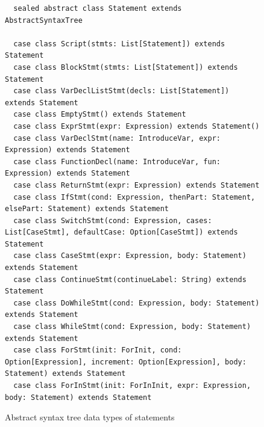 \documentclass[12pt]{report}
\begin{document}
\begin{figure}
{}
\begin{lstlisting}
  sealed abstract class Statement extends AbstractSyntaxTree

  case class Script(stmts: List[Statement]) extends  Statement
  case class BlockStmt(stmts: List[Statement]) extends Statement
  case class VarDeclListStmt(decls: List[Statement]) extends Statement
  case class EmptyStmt() extends Statement
  case class ExprStmt(expr: Expression) extends Statement()
  case class VarDeclStmt(name: IntroduceVar, expr: Expression) extends Statement
  case class FunctionDecl(name: IntroduceVar, fun: Expression) extends Statement
  case class ReturnStmt(expr: Expression) extends Statement
  case class IfStmt(cond: Expression, thenPart: Statement, elsePart: Statement) extends Statement
  case class SwitchStmt(cond: Expression, cases: List[CaseStmt], defaultCase: Option[CaseStmt]) extends Statement
  case class CaseStmt(expr: Expression, body: Statement) extends Statement
  case class ContinueStmt(continueLabel: String) extends Statement
  case class DoWhileStmt(cond: Expression, body: Statement) extends Statement
  case class WhileStmt(cond: Expression, body: Statement) extends Statement
  case class ForStmt(init: ForInit, cond: Option[Expression], increment: Option[Expression], body: Statement) extends Statement
  case class ForInStmt(init: ForInInit, expr: Expression, body: Statement) extends Statement

\end{lstlisting}
\caption{Abstract syntax tree data types of statements}
\label{fig:js-stmt}
\end{figure}
\end{document}
